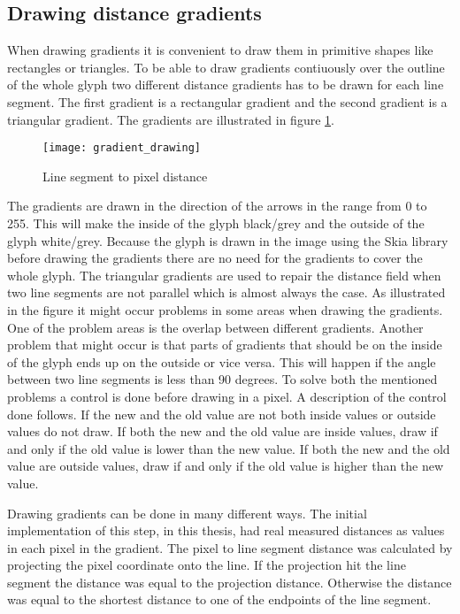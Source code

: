 \subsection{Drawing distance gradients}
When drawing gradients it is convenient to draw them in primitive shapes like rectangles or triangles. To be able to draw gradients contiuously over the outline of the whole glyph two different distance gradients has to be drawn for each line segment. The first gradient is a rectangular gradient and the second gradient is a triangular gradient. The gradients are illustrated in figure \ref{fig:grad}.

\begin{figure}[H]
\texttt{[image: gradient\_drawing]}
\caption{Line segment to pixel distance}
\label{fig:grad}
\end{figure}

The gradients are drawn in the direction of the arrows in the range from 0 to 255. This will make the inside of the glyph black/grey and the outside of the glyph white/grey. Because the glyph is drawn in the image using the Skia library before drawing the gradients there are no need for the gradients to cover the whole glyph. The triangular gradients are used to repair the distance field when two line segments are not parallel which is almost always the case. As illustrated in the figure it might occur problems in some areas when drawing the gradients. One of the problem areas is the overlap between different gradients. Another problem that might occur is that parts of gradients that should be on the inside of the glyph ends up on the outside or vice versa. This will happen if the angle between two line segments is less than 90 degrees. To solve both the mentioned problems a control is done before drawing in a pixel. A description of the control done follows. If the new and the old value are not both inside values or outside values do not draw. If both the new and the old value are inside values, draw if and only if the old value is lower than the new value. If both the new and the old value are outside values, draw if and only if the old value is higher than the new value.

Drawing gradients can be done in many different ways. The initial implementation of this step, in this thesis, had real measured distances as values in each pixel in the gradient. The pixel to line segment distance was calculated by projecting the pixel coordinate onto the line. If the projection hit the line segment the distance was equal to the projection distance. Otherwise the distance was equal to the shortest distance to one of the endpoints of the line segment.

